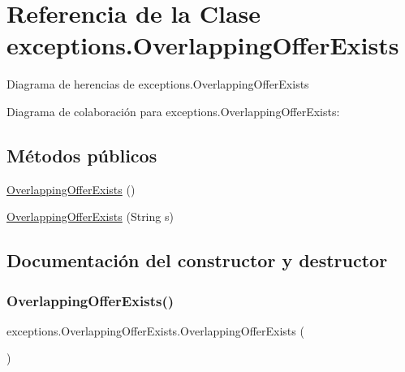 \hypertarget{classexceptions_1_1_overlapping_offer_exists}{}\section{Referencia de la Clase exceptions.\+Overlapping\+Offer\+Exists}
\label{classexceptions_1_1_overlapping_offer_exists}


Diagrama de herencias de exceptions.\+Overlapping\+Offer\+Exists


Diagrama de colaboración para exceptions.\+Overlapping\+Offer\+Exists\+:
\subsection*{Métodos públicos}
\begin{DoxyCompactItemize}
\item 
\mbox{\hyperlink{classexceptions_1_1_overlapping_offer_exists_a1ba2d73acc9428e642786973e8b2b6b3}{Overlapping\+Offer\+Exists}} ()
\item 
\mbox{\hyperlink{classexceptions_1_1_overlapping_offer_exists_a053baab9b6c9e1da073098c4cfbcdc45}{Overlapping\+Offer\+Exists}} (String s)
\end{DoxyCompactItemize}


\subsection{Documentación del constructor y destructor}
\mbox{\label{classexceptions_1_1_overlapping_offer_exists_a1ba2d73acc9428e642786973e8b2b6b3}} 
\subsubsection{\texorpdfstring{OverlappingOfferExists()}{OverlappingOfferExists()}\hspace{0.1cm}{\footnotesize\ttfamily [1/2]}}
{\footnotesize\ttfamily exceptions.\+Overlapping\+Offer\+Exists.\+Overlapping\+Offer\+Exists (\begin{DoxyParamCaption}{ }\end{DoxyParamCaption})}

